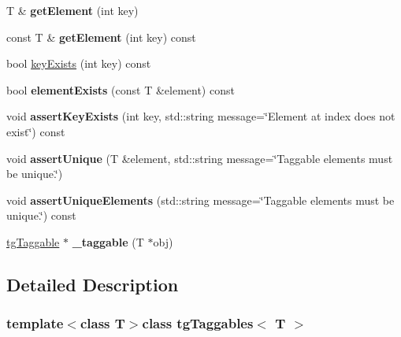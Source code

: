\begin{DoxyCompactItemize}
\item 
\hypertarget{classtg_taggables_a579393f46ed07b0620987ebdcc50bd25}{T \& {\bfseries get\-Element} (int key)}\label{classtg_taggables_a579393f46ed07b0620987ebdcc50bd25}

\item 
\hypertarget{classtg_taggables_a35830f2d7f865f692f8abd529ba93d0f}{const T \& {\bfseries get\-Element} (int key) const }\label{classtg_taggables_a35830f2d7f865f692f8abd529ba93d0f}

\item 
bool \hyperlink{classtg_taggables_ac2922a09a3b3885c8f6f4d0c97b247a9}{key\-Exists} (int key) const 
\item 
\hypertarget{classtg_taggables_a54045c97e415be9bc8422b0e100b6fee}{bool {\bfseries element\-Exists} (const T \&element) const }\label{classtg_taggables_a54045c97e415be9bc8422b0e100b6fee}

\item 
\hypertarget{classtg_taggables_aebe6b45ca9d42a229224616c54460161}{void {\bfseries assert\-Key\-Exists} (int key, std\-::string message=\char`\"{}Element at index does not exist\char`\"{}) const }\label{classtg_taggables_aebe6b45ca9d42a229224616c54460161}

\item 
\hypertarget{classtg_taggables_a2428d80a02f7344ac146710f1c4222d1}{void {\bfseries assert\-Unique} (T \&element, std\-::string message=\char`\"{}Taggable elements must be unique.\char`\"{})}\label{classtg_taggables_a2428d80a02f7344ac146710f1c4222d1}

\item 
\hypertarget{classtg_taggables_abb1aa6daab7d692173a9f9c2f84e39a7}{void {\bfseries assert\-Unique\-Elements} (std\-::string message=\char`\"{}Taggable elements must be unique.\char`\"{}) const }\label{classtg_taggables_abb1aa6daab7d692173a9f9c2f84e39a7}

\item 
\hypertarget{classtg_taggables_a0188b2313dad65b78fad978c6a25d015}{\hyperlink{classtg_taggable}{tg\-Taggable} $\ast$ {\bfseries \-\_\-taggable} (T $\ast$obj)}\label{classtg_taggables_a0188b2313dad65b78fad978c6a25d015}

\end{DoxyCompactItemize}


\subsection{Detailed Description}
\subsubsection*{template$<$class T$>$class tg\-Taggables$<$ T $>$}



